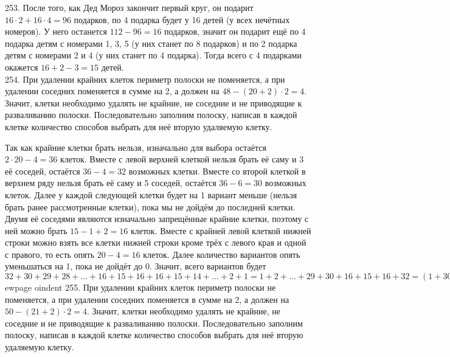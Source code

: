 253. После того, как Дед Мороз закончит первый круг, он подарит $16\cdot2+16\cdot4=96$ подарков, по 4 подарка будет у 16 детей (у всех нечётных номеров). У него останется $112-96=16$ подарков, значит он подарит ещё по 4 подарка детям с номерами 1, 3, 5 (у них станет по 8 подарков) и по 2 подарка детям с номерами 2 и 4 (у них станет по 4 подарка). Тогда всего с 4 подарками окажется $16+2-3=15$ детей.\\
254. При удалении крайних клеток периметр полоски не поменяется, а при удалении соседних поменяется в сумме на 2, а должен на $48-(20+2)\cdot2=4.$ Значит, клетки необходимо удалять не крайние, не соседние и не приводящие к разваливанию полоски. Последовательно заполним полоску, написав в каждой клетке количество способов выбрать для неё вторую удаляемую клетку.
\begin{center}
\begin{figure}[ht!]
\end{figure}
\end{center}
Так как крайние клетки брать нельзя, изначально для выбора остаётся $2\cdot20-4=36$ клеток. Вместе с левой верхней клеткой нельзя брать её саму и 3 её соседей, остаётся $36-4=32$ возможных клетки. Вместе со второй клеткой в верхнем ряду нельзя брать её саму и 5 соседей, остаётся $36-6=30$ возможных клеток. Далее у каждой следующей клетки будет на 1 вариант меньше (нельзя брать ранее рассмотренные клетки), пока мы не дойдём до последней клетки. Двумя её соседями являются изначально запрещённые крайние клетки, поэтому с ней можно брать $15-1+2=16$ клеток. Вместе с крайней левой клеткой нижней строки можно взять все клетки нижней строки кроме трёх с левого края и одной с правого, то есть опять $20-4=16$ клеток. Далее количество вариантов опять уменьшаться на 1, пока не дойдёт до 0. Значит, всего вариантов будет $32+30+29+28+\ldots+16+15+16+16+15+14+\ldots+2+1=1+2+\ldots+29+30+16+15+16+32=(1+30)+(2+29)+\ldots+(15+16)+79=31\cdot15+79=544.$
ewpage
oindent
255. При удалении крайних клеток периметр полоски не поменяется, а при удалении соседних поменяется в сумме на 2, а должен на $50-(21+2)\cdot2=4.$ Значит, клетки необходимо удалять не крайние, не соседние и не приводящие к разваливанию полоски. Последовательно заполним полоску, написав в каждой клетке количество способов выбрать для неё вторую удаляемую клетку.
\begin{center}
\begin{figure}[ht!]
\end{figure}
\end{center}
